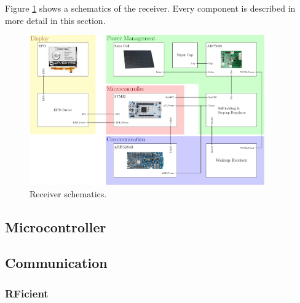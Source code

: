 Figure \ref{hardware:block} shows a schematics of the receiver.
Every component is described in more detail in this section.

\begin{figure}[ht]
	\centering
	\includegraphics[width=0.9\textwidth]{4-development/hardware/graphics/top/top_schematics.pdf}
	\caption{Receiver schematics.\label{hardware:block}}
\end{figure}

\subsection{Microcontroller}

\subsection{Communication}

\subsubsection{RFicient}

